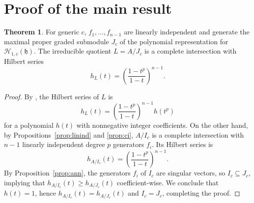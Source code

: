 \documentclass{amsart}
\numberwithin{equation}{section}
\theoremstyle{definition}
\newtheorem{theorem}{Theorem}[section]
\newcommand{\h}{\mathfrak{h}}
\newcommand{\HH}{\mathcal{H}}
\begin{document}
\section{Proof of the main result}

\begin{theorem}\label{thm:main}
For generic $c$, $f_1, \ldots, f_{n-1}$ are linearly independent and generate the maximal proper graded submodule $J_c$ of the polynomial representation for $\HH_{1, c}(\h)$.  The irreducible quotient $L = A/J_c$ is a complete intersection with Hilbert series 
\[
h_L(t) = \left(\frac{1-t^p}{1-t}\right)^{n-1}.
\]
\end{theorem}
\begin{proof}
By \cite[Proposition 3.4]{BC1}, the Hilbert series of $L$ is 
\[
h_L(t) = \left(\frac{1-t^p}{1-t}\right)^{n-1}h(t^p)
\]
for a polynomial $h(t)$ with nonnegative integer coefficients.  On the other hand, by Propositions~\ref{prop:linind} and \ref{prop:ci}, $A/I_c$ is a complete intersection with $n-1$ linearly independent degree $p$ generators $f_i$. Its Hilbert series is
\[
h_{A/I_c}(t)=\left(\frac{1-t^p}{1-t}\right)^{n-1}.
\]
By Proposition~\ref{prop:ann}, the generators $f_i$ of $I_c$ are singular vectors, so $I_c \subseteq J_c$, implying that $h_{A/I_c}(t) \ge h_{A/J_c}(t)$ coefficient-wise.  We conclude that $h(t) = 1$, hence $h_{A/I_c}(t)=h_{A/J_c}(t)$ and $I_c=J_c$, completing the proof.
\end{proof}



\end{document}
